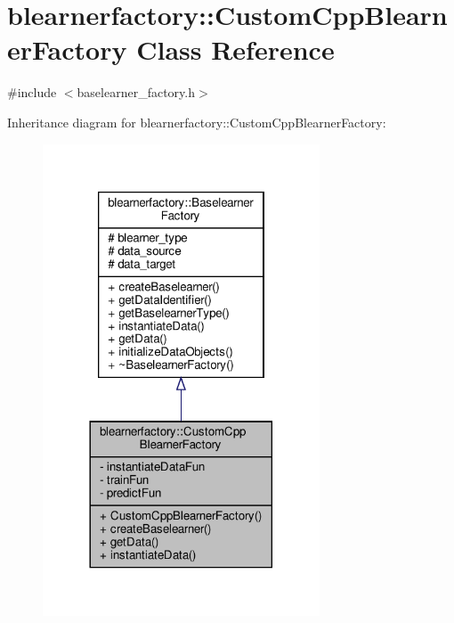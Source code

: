 \hypertarget{classblearnerfactory_1_1_custom_cpp_blearner_factory}{}\section{blearnerfactory\+:\+:Custom\+Cpp\+Blearner\+Factory Class Reference}
\label{classblearnerfactory_1_1_custom_cpp_blearner_factory}


{\ttfamily \#include $<$baselearner\+\_\+factory.\+h$>$}



Inheritance diagram for blearnerfactory\+:\+:Custom\+Cpp\+Blearner\+Factory\+:\nopagebreak
\begin{figure}[H]
\begin{center}
\leavevmode
\includegraphics[width=233pt]{classblearnerfactory_1_1_custom_cpp_blearner_factory__inherit__graph}
\end{center}
\end{figure}


